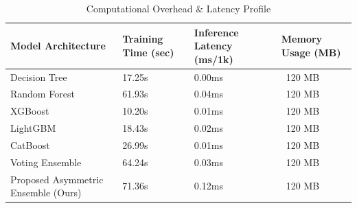 \begin{table}
\caption{Computational Overhead & Latency Profile}
\label{tab:comp_cost}
\begin{tabular}{llll}
\toprule
Model Architecture & Training Time (sec) & Inference Latency (ms/1k) & Memory Usage (MB) \\
\midrule
Decision Tree & 17.25s & 0.00ms & ~120 MB \\
Random Forest & 61.93s & 0.04ms & ~120 MB \\
XGBoost & 10.20s & 0.01ms & ~120 MB \\
LightGBM & 18.43s & 0.02ms & ~120 MB \\
CatBoost & 26.99s & 0.01ms & ~120 MB \\
Voting Ensemble & 64.24s & 0.03ms & ~120 MB \\
Proposed Asymmetric Ensemble (Ours) & 71.36s & 0.12ms & ~120 MB \\
\bottomrule
\end{tabular}
\end{table}
